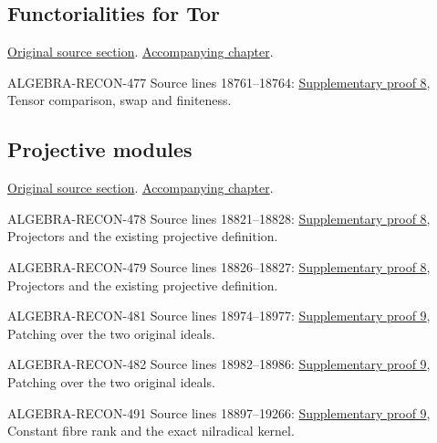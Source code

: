 \subsection{Functorialities for Tor}
\hypertarget{algebra-source-section-functoriality-tor}{}
\noindent\href{https://github.com/stacks/stacks-project/blob/a04446e57ec1fbc252a871afcec7752fb2807b14/algebra.tex\#L18713}{Original source section}. \href{algebra.pdf\#nameddest=section-functoriality-tor}{Accompanying chapter}.

\begin{AlgebraSourceRoutes}
\item[ALGEBRA-RECON-477] Source lines 18761--18764: \hyperlink{algebra_depth_tor_projective_notes_20260927}{Supplementary proof 8}, Tensor comparison, swap and finiteness.
\end{AlgebraSourceRoutes}

\subsection{Projective modules}
\hypertarget{algebra-source-section-projective}{}
\noindent\href{https://github.com/stacks/stacks-project/blob/a04446e57ec1fbc252a871afcec7752fb2807b14/algebra.tex\#L18774}{Original source section}. \href{algebra.pdf\#nameddest=section-projective}{Accompanying chapter}.

\begin{AlgebraSourceRoutes}
\item[ALGEBRA-RECON-478] Source lines 18821--18828: \hyperlink{algebra_depth_tor_projective_notes_20260927}{Supplementary proof 8}, Projectors and the existing projective definition.
\item[ALGEBRA-RECON-479] Source lines 18826--18827: \hyperlink{algebra_depth_tor_projective_notes_20260927}{Supplementary proof 8}, Projectors and the existing projective definition.
\item[ALGEBRA-RECON-481] Source lines 18974--18977: \hyperlink{algebra_projective_lifting_notes_20260927}{Supplementary proof 9}, Patching over the two original ideals.
\item[ALGEBRA-RECON-482] Source lines 18982--18986: \hyperlink{algebra_projective_lifting_notes_20260927}{Supplementary proof 9}, Patching over the two original ideals.
\item[ALGEBRA-RECON-491] Source lines 18897--19266: \hyperlink{algebra_projective_lifting_notes_20260927}{Supplementary proof 9}, Constant fibre rank and the exact nilradical kernel.
\end{AlgebraSourceRoutes}

